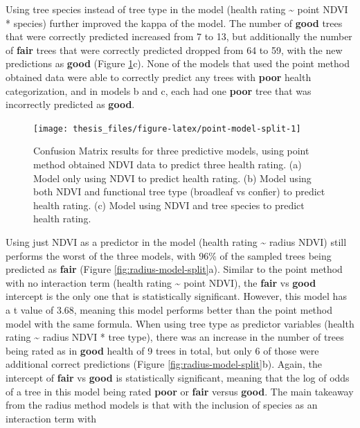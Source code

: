 \documentclass[12pt,twoside]{reedthesis}
\begin{document}
Using tree species instead of tree type in the model (health rating \textasciitilde{}
point NDVI * species) further improved the kappa of the model. The
number of \textbf{good} trees that were correctly predicted increased from 7
to 13, but additionally the number of \textbf{fair} trees that were correctly
predicted dropped from 64 to 59, with the new predictions as \textbf{good}
(Figure \ref{fig:point-model-split}c). None of the models that used the
point method obtained data were able to correctly predict any trees with
\textbf{poor} health categorization, and in models b and c, each had one
\textbf{poor} tree that was incorrectly predicted as \textbf{good}.
\begin{figure}[H]

{\centering \texttt{[image: thesis\_files/figure-latex/point-model-split-1]} 

}

\caption[Confusion matrixes for Point method predictive models]{Confusion Matrix results for three predictive models, using point method obtained NDVI data to predict three health rating. (a) Model only using NDVI to predict health rating. (b) Model using both NDVI and functional tree type (broadleaf vs confier) to predict health rating. (c) Model using NDVI and tree species to predict health rating.}\label{fig:point-model-split}
\end{figure}
Using just NDVI as a predictor in the model (health rating \textasciitilde{} radius
NDVI) still performs the worst of the three models, with 96\% of the
sampled trees being predicted as \textbf{fair} (Figure
\ref{fig:radius-model-split}a). Similar to the point method with no
interaction term (health rating \textasciitilde{} point NDVI), the \textbf{fair} vs \textbf{good}
intercept is the only one that is statistically significant. However,
this model has a t value of 3.68, meaning this model performs better
than the point method model with the same formula. When using tree type
as predictor variables (health rating \textasciitilde{} radius NDVI * tree type),
there was an increase in the number of trees being rated as in \textbf{good}
health of 9 trees in total, but only 6 of those were additional correct
predictions (Figure \ref{fig:radius-model-split}b). Again, the
intercept of \textbf{fair} vs \textbf{good} is statistically significant, meaning
that the log of odds of a tree in this model being rated \textbf{poor} or
\textbf{fair} versus \textbf{good}. The main takeaway from the radius method
models is that with the inclusion of species as an interaction term with
\end{document}
